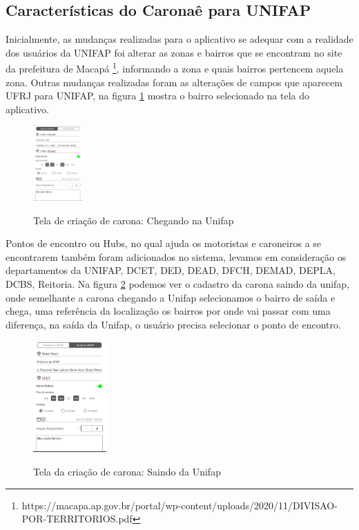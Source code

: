 \subsection{Características do Caronaê para UNIFAP}

Inicialmente, as mudanças realizadas para o aplicativo se adequar com a realidade dos usuários da UNIFAP foi alterar as zonas e bairros que se encontram no site da prefeitura de Macapá \footnote{https://macapa.ap.gov.br/portal/wp-content/uploads/2020/11/DIVISAO-POR-TERRITORIOS.pdf}, informando a zona e quais bairros pertencem aquela zona. Outras mudanças realizadas foram as alterações de campos que aparecem UFRJ para UNIFAP, na figura \ref{fig:carona_ate_a_unifap} mostra o bairro selecionado na tela do aplicativo.

\begin{figure}[!hbtp]
	\centering
	\caption{Tela de criação de carona: Chegando na Unifap}
	\includegraphics[width=0.17\textwidth]{./04-figuras/caronae/tela_criacao_da_carona_de_chegada_na_unifap.png}
	\label{fig:carona_ate_a_unifap}
\end{figure}

Pontos de encontro ou Hubs, no qual ajuda os motoristas e caroneiros a se encontrarem também foram adicionados no sistema, levamos em consideração os departamentos da UNIFAP, DCET, DED, DEAD, DFCH, DEMAD, DEPLA, DCBS, Reitoria. Na figura \ref{fig:carona_saindo_da_unifap} podemos ver o cadastro da carona saindo da unifap, onde semelhante a carona chegando a Unifap selecionamos o bairro de saída e chega, uma referência da localização os bairros por onde vai passar com uma diferença, na saída da Unifap, o usuário precisa selecionar o ponto de encontro.

\begin{figure}[!hbtp]
	\centering
	\caption{Tela da criação de carona: Saindo da Unifap}
	\includegraphics[width=0.25\textwidth]{./04-figuras/caronae/tela_criacao_da_carona_de_saida_da_unifapp.png}
	\label{fig:carona_saindo_da_unifap}
\end{figure}

